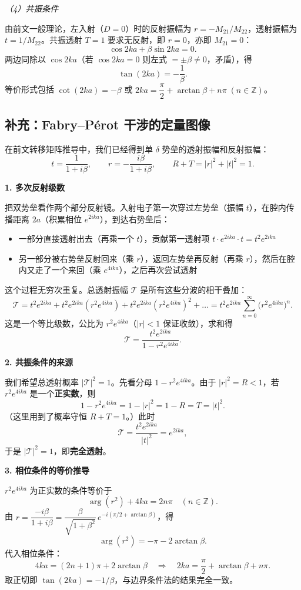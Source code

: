 \textit{（4）共振条件}

由前文一般理论，左入射（$D=0$）时的反射振幅为 $r=-M_{21}/M_{22}$，透射振幅为 $t=1/M_{22}$。共振透射 $T=1$ 要求无反射，即 $r=0$，亦即 $M_{21}=0$：
\[
\cos 2ka + \beta\sin 2ka = 0.
\]
两边同除以 $\cos 2ka$（若 $\cos 2ka=0$ 则左式 $=\pm\beta\neq 0$，矛盾），得
\[
\boxed{\tan(2ka) = -\frac{1}{\beta}}.
\]
等价形式包括 $\cot(2ka)=-\beta$ 或 $2ka = \dfrac{\pi}{2}+\arctan\beta + n\pi\;(n\in\mathbb{Z})$。

\subsection{补充：Fabry--P\'erot 干涉的定量图像}

在前文转移矩阵推导中，我们已经得到单 $\delta$ 势垒的透射振幅和反射振幅：
\[
t = \frac{1}{1+i\beta}, \qquad r = -\frac{i\beta}{1+i\beta}, \qquad R+T=|r|^2+|t|^2=1.
\]

\textbf{1. 多次反射级数}

把双势垒看作两个部分反射镜。入射电子第一次穿过左势垒（振幅 $t$），在腔内传播距离 $2a$（积累相位 $e^{2ika}$），到达右势垒后：
\begin{itemize}[nosep]
    \item 一部分直接透射出去（再乘一个 $t$），贡献第一透射项 $t\cdot e^{2ika}\cdot t = t^2 e^{2ika}$
    \item 另一部分被右势垒反射回来（乘 $r$），返回左势垒再反射（再乘 $r$），然后在腔内又走了一个来回（乘 $e^{4ika}$），之后再次尝试透射
\end{itemize}
这个过程无穷次重复。总透射振幅 $\mathcal{T}$ 是所有这些分波的相干叠加：
\[
\mathcal{T} = t^2 e^{2ika} + t^2 e^{2ika}(r^2 e^{4ika}) + t^2 e^{2ika}(r^2 e^{4ika})^2 + \dots
= t^2 e^{2ika} \sum_{n=0}^{\infty} \bigl(r^2 e^{4ika}\bigr)^n.
\]
这是一个等比级数，公比为 $r^2 e^{4ika}$（$|r|<1$ 保证收敛），求和得
\[
\boxed{\mathcal{T} = \frac{t^2 e^{2ika}}{1 - r^2 e^{4ika}}}.
\]

\textbf{2. 共振条件的来源}

我们希望总透射概率 $|\mathcal{T}|^2 = 1$。先看分母 $1 - r^2 e^{4ika}$。由于 $|r|^2 = R < 1$，若 $r^2 e^{4ika}$ 是一个\textbf{正实数}，则
\[
1 - r^2 e^{4ika} = 1 - |r|^2 = 1 - R = T = |t|^2.
\]
（这里用到了概率守恒 $R+T=1$。）此时
\[
\mathcal{T} = \frac{t^2 e^{2ika}}{|t|^2} = e^{2ika},
\]
于是 $|\mathcal{T}|^2 = 1$，即\textbf{完全透射}。

\textbf{3. 相位条件的等价推导}

$r^2 e^{4ika}$ 为正实数的条件等价于
\[
\arg(r^2) + 4ka = 2n\pi \quad (n\in\mathbb{Z}).
\]
由 $r = \dfrac{-i\beta}{1+i\beta} = \dfrac{\beta}{\sqrt{1+\beta^2}}\,e^{-i(\pi/2+\arctan\beta)}$，得
\[
\arg(r^2) = -\pi - 2\arctan\beta.
\]
代入相位条件：
\[
4ka = (2n+1)\pi + 2\arctan\beta
\quad\Longrightarrow\quad
2ka = \frac{\pi}{2} + \arctan\beta + n\pi.
\]
取正切即 $\tan(2ka) = -1/\beta$，与边界条件法的结果完全一致。

